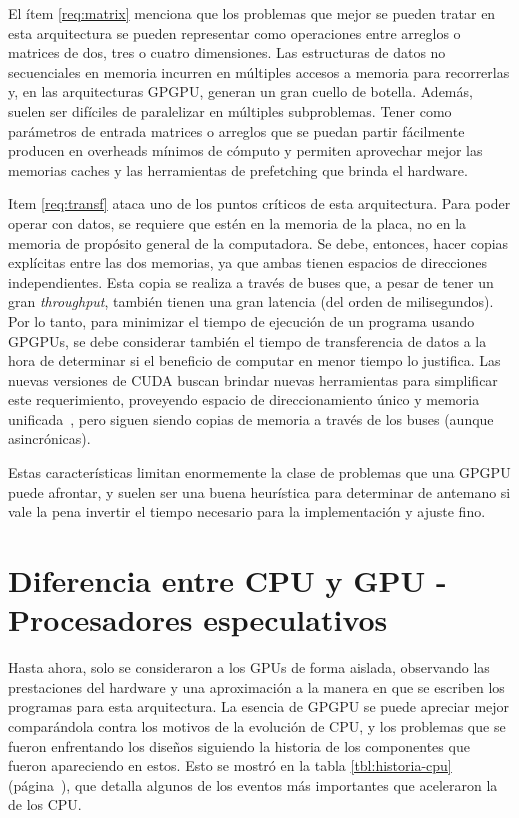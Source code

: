 El \'item \ref{req:matrix} menciona que los problemas que mejor se pueden tratar en esta arquitectura se pueden representar como operaciones entre arreglos o matrices de
dos, tres o cuatro dimensiones.
Las estructuras de datos no secuenciales en memoria incurren en m\'ultiples accesos a memoria para recorrerlas y, en las arquitecturas GPGPU, generan un gran cuello de botella.
Adem\'as, suelen ser dif\'iciles de paralelizar en m\'ultiples subproblemas.
Tener como par\'ametros de entrada matrices o arreglos que se puedan partir f\'acilmente producen en overheads m\'inimos de c\'omputo y permiten aprovechar mejor las memorias caches y las herramientas de prefetching que brinda el hardware.

Item \ref{req:transf} ataca uno de los puntos cr\'iticos de esta arquitectura.
Para poder operar con datos, se requiere que est\'en en la memoria de la placa, no en la memoria de prop\'osito general de la computadora.
Se debe, entonces, hacer copias expl\'icitas entre las dos memorias, ya que ambas tienen espacios de direcciones independientes.
Esta copia se realiza a trav\'es de buses que, a pesar de tener un gran \emph{throughput}, tambi\'en tienen una gran latencia (del orden de milisegundos).
Por lo tanto, para minimizar el tiempo de ejecuci\'on de un programa usando GPGPUs, se debe considerar tambi\'en el tiempo de transferencia de datos a la hora de determinar si el beneficio de computar en menor tiempo lo justifica.
Las nuevas versiones de CUDA buscan brindar nuevas herramientas para simplificar este requerimiento, proveyendo espacio de direccionamiento \'unico y memoria unificada~\cite{farberCuda}, pero siguen siendo copias de memoria a trav\'es de los buses (aunque asincr\'onicas).

Estas caracter\'isticas limitan enormemente la clase de problemas que una GPGPU puede afrontar, y suelen ser una buena heur\'istica para determinar de antemano si vale la pena
invertir el tiempo necesario para la implementaci\'on y ajuste fino.

\section{Diferencia entre CPU y GPU - Procesadores especulativos}

Hasta ahora, solo se consideraron a los GPUs de forma aislada, observando las prestaciones del hardware y una aproximaci\'on a la manera en que se escriben los programas para esta arquitectura.
La esencia de GPGPU se puede apreciar mejor compar\'andola contra los motivos de la evoluci\'on de CPU, y los problemas que se fueron enfrentando los dise\~nos siguiendo la historia de los componentes que fueron apareciendo en estos.
Esto se mostr\'o en la tabla \ref{tbl:historia-cpu} (p\'agina~\pageref{tbl:historia-cpu}), que detalla algunos de los eventos m\'as importantes que aceleraron
la \performance{} de los CPU.

